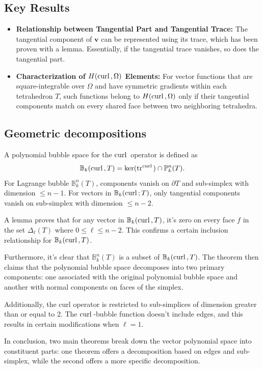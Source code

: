 \documentclass[12pt, a4paper]{article}
\newcommand{\curl}{{\rm curl\,}}
\newcommand{\tr}{\operatorname{tr}}
\begin{document}
\subsection{Key Results}
\begin{itemize}
    \item \textbf{Relationship between Tangential Part and Tangential Trace:}
        The tangential component of $\boldsymbol v$ can be represented using its
        trace, which has been proven with a lemma. Essentially, if the
        tangential trace vanishes, so does the tangential part.
    
    \item \textbf{Characterization of $H(\curl,\Omega)$ Elements:} For vector
        functions that are square-integrable over $\Omega$ and have symmetric
        gradients within each tetrahedron $T$, such functions belong to
        $H(\curl,\Omega)$ only if their tangential components match on every
        shared face between two neighboring tetrahedra.
\end{itemize}

\subsection{Geometric decompositions}
A polynomial bubble space for the $\curl$ operator is defined as
\[
\mathbb B_k(\curl, T) = \ker(\tr^{\curl})\cap \mathbb P_k^n(T).
\]
For Lagrange bubble $\mathbb B_k^n(T)$, components vanish on $\partial T$ and
sub-simplex with dimension $\leq n-1$. For vectors in $\mathbb B_k(\curl; T)$,
only tangential components vanish on sub-simplex with dimension $\leq n-2$.

A lemma proves that for any vector in $\mathbb B_k(\curl, T)$, it's zero on
every face $f$ in the set $\Delta_{\ell}(T)$ where $0\leq \ell\leq n-2$. This
confirms a certain inclusion relationship for $\mathbb B_k(\curl, T)$.

Furthermore, it's clear that $\mathbb B_k^n(T)$ is a subset of $\mathbb
B_k(\curl, T)$. The theorem then claims that the polynomial bubble space
decomposes into two primary components: one associated with the original
polynomial bubble space and another with normal components on faces of the
simplex.

Additionally, the curl operator is restricted to sub-simplices of dimension
greater than or equal to 2. The $\curl$-bubble function doesn't include edges,
and this results in certain modifications when $\ell=1$.

In conclusion, two main theorems break down the vector polynomial space into
constituent parts: one theorem offers a decomposition based on edges and
sub-simplex, while the second offers a more specific decomposition.
\end{document}
